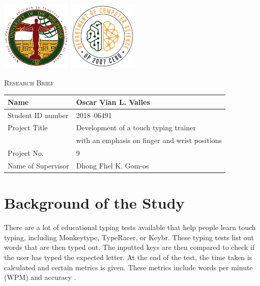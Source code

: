 \documentclass{report}
\begin{document}
\begin{titlepage}
	\centering
	\includegraphics[width=0.25\textwidth]{upc.png}
	\includegraphics[width=0.25\textwidth]{dcs.png}
	\par\vspace{1cm}
	{\scshape\LARGE Research Brief \par}
	\par\vspace{1cm}
	\begin{tabular}{ | l | l | }
		\hline
		Name               & Oscar Vian L. Valles                  \\
		\hline
		Student ID number  & 2018--06491                           \\
		\hline
		Project Title      & Development of a touch typing trainer \\ & with an emphasis on finger and wrist positions\\
		\hline
		Project No.        & 9                                     \\
		\hline
		Name of Supervisor & Dhong Fhel K. Gom-os                  \\
		\hline
	\end{tabular}




\end{titlepage}
\newpage

\tableofcontents
\newpage


\setcounter{chapter}{1}
\section{Background of the Study}
There are a lot of educational typing tests available that help people learn
touch typing, including Monkeytype, TypeRacer, or Keybr. These typing tests list
out words that are then typed out. The inputted keys are then compared to check
if the user has typed the expected letter. At the end of the test, the time
taken is calculated and certain metrics is given. These metrics include words
per minute (WPM) and accuracy \parencite{bartnik2021}.
\end{document}
